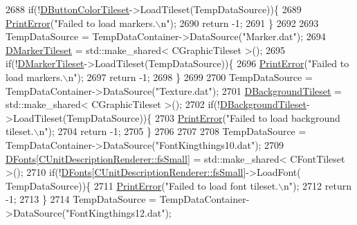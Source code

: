 \begin{DoxyCode}
2688     \textcolor{keywordflow}{if}(!\hyperlink{classCApplicationData_a7482e0b4d7e0ce4979eb9f28872023ad}{DButtonColorTileset}->LoadTileset(TempDataSource))\{
2689         \hyperlink{Debug_8h_a2ed825eefefe35baf59a93a8c641323d}{PrintError}(\textcolor{stringliteral}{"Failed to load markers.\(\backslash\)n"});
2690         \textcolor{keywordflow}{return} -1;
2691     \}
2692     
2693     TempDataSource = TempDataContainer->DataSource(\textcolor{stringliteral}{"Marker.dat"});
2694     \hyperlink{classCApplicationData_ae9f336696b810bff2353d731300ec9d7}{DMarkerTileset} = std::make\_shared< CGraphicTileset >();
2695     \textcolor{keywordflow}{if}(!\hyperlink{classCApplicationData_ae9f336696b810bff2353d731300ec9d7}{DMarkerTileset}->LoadTileset(TempDataSource))\{
2696         \hyperlink{Debug_8h_a2ed825eefefe35baf59a93a8c641323d}{PrintError}(\textcolor{stringliteral}{"Failed to load markers.\(\backslash\)n"});
2697         \textcolor{keywordflow}{return} -1;
2698     \}
2699     
2700     TempDataSource = TempDataContainer->DataSource(\textcolor{stringliteral}{"Texture.dat"});
2701     \hyperlink{classCApplicationData_a93e478c5552a527fe2d680cac8fc910d}{DBackgroundTileset} = std::make\_shared< CGraphicTileset >();
2702     \textcolor{keywordflow}{if}(!\hyperlink{classCApplicationData_a93e478c5552a527fe2d680cac8fc910d}{DBackgroundTileset}->LoadTileset(TempDataSource))\{
2703         \hyperlink{Debug_8h_a2ed825eefefe35baf59a93a8c641323d}{PrintError}(\textcolor{stringliteral}{"Failed to load background tileset.\(\backslash\)n"});
2704         \textcolor{keywordflow}{return} -1;
2705     \}    
2706     
2707     
2708     TempDataSource = TempDataContainer->DataSource(\textcolor{stringliteral}{"FontKingthings10.dat"});
2709     \hyperlink{classCApplicationData_afde9247d0a3ea87393ec86dcdb1e8274}{DFonts}[\hyperlink{classCUnitDescriptionRenderer_a3ea4cd83b6dd9533ab3abb953a7da35aaa0ab2dd25d9db891e7a7158795b46c63}{CUnitDescriptionRenderer::fsSmall}] = std::make\_shared<
       CFontTileset >();
2710     \textcolor{keywordflow}{if}(!\hyperlink{classCApplicationData_afde9247d0a3ea87393ec86dcdb1e8274}{DFonts}[\hyperlink{classCUnitDescriptionRenderer_a3ea4cd83b6dd9533ab3abb953a7da35aaa0ab2dd25d9db891e7a7158795b46c63}{CUnitDescriptionRenderer::fsSmall}]->LoadFont(
      TempDataSource))\{
2711         \hyperlink{Debug_8h_a2ed825eefefe35baf59a93a8c641323d}{PrintError}(\textcolor{stringliteral}{"Failed to load font tileset.\(\backslash\)n"});
2712         \textcolor{keywordflow}{return} -1;
2713     \}
2714     TempDataSource = TempDataContainer->DataSource(\textcolor{stringliteral}{"FontKingthings12.dat"});

\end{DoxyCode}
